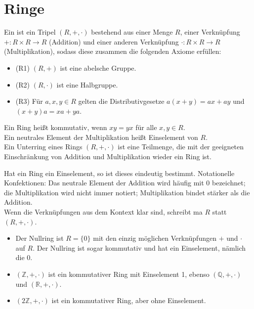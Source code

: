 \section{Ringe}

\begin{definition}[Ring]
	Ein  ist ein Tripel $(R,+,\cdot)$ bestehend aus einer Menge
	$R$, einer Verknüpfung $+: R \times R \to R$ (Addition) und einer anderen Verknüpfung
	$\cdot: R \times R \to R$ (Multiplikation), sodass diese zusammen die folgenden Axiome 
	erfüllen:
	\begin{itemize}
		\item (R1) $(R,+)$ ist eine abelsche Gruppe.
		\item (R2) $(R,\cdot)$ ist eine Halbgruppe.
		\item (R3) Für $a,x,y \in R$ gelten die Distributivgesetze $a(x+y)=ax+ay$ und $(x+y)a=xa+ya$.
	\end{itemize}
	Ein Ring heißt kommutativ, wenn $xy=yx$ für alle $x,y \in R$.\\
	Ein neutrales Element der Multiplikation heißt Einselement von $R$.\\
	Ein Unterring eines Rings $(R,+,\cdot)$ ist eine Teilmenge, die mit der geeigneten
	Einschränkung von Addition und Multiplikation wieder ein Ring ist.
\end{definition}

\begin{remark}
	Hat ein Ring ein Einselement, so ist dieses eindeutig bestimmt. Notationelle Konfektionen: Das 
	neutrale Element der Addition wird häufig mit 0 bezeichnet; die Multiplikation wird nicht immer
	notiert; Multiplikation bindet stärker als die Addition. \\
	Wenn die Verknüpfungen aus dem Kontext klar sind, schreibt ma $R$ statt $(R,+,\cdot)$.
\end{remark}

\begin{example}
	\begin{itemize}
		\item Der Nullring ist $R=\{0\}$ mit den einzig möglichen Verknüpfungen $+$ und $\cdot$
		auf $R$. Der Nullring ist sogar kommutativ und hat ein Einselement, nämlich die 0.
		\item $(\mathbb{Z},+,\cdot)$ ist ein kommutativer Ring mit Einselement 1, ebenso
		$(\mathbb{Q},+,\cdot)$ und $(\mathbb{R},+,\cdot)$. 
		\item $(2\mathbb{Z},+,\cdot)$ ist ein kommutativer Ring, aber ohne Einselement.
	\end{itemize}
\end{example}

